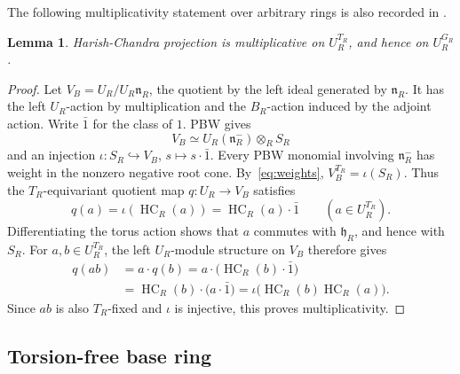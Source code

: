 \documentclass[twoside,a4paper,12pt,reqno]{amsart}
\newtheorem{lemma}[theorem]{Lemma}
\theoremstyle{remark}
\numberwithin{equation}{section}
\newcommand{\fh}{\mathfrak h}
\newcommand{\fn}{\mathfrak n}
\DeclareMathOperator{\HC}{HC}
\newcommand{\into}{\hookrightarrow}
\begin{document}
The following multiplicativity statement over arbitrary rings is also recorded in \cite[\S2.6.1]{PT}.

\begin{lemma}\label{lem:multiplicativity}
Harish-Chandra projection is multiplicative on \(U_R^{T_R}\), and hence on \(U_R^{G_R}\).
\end{lemma}
\begin{proof}
Let \(V_B=U_R/U_R\fn_R\), the quotient by the left ideal generated by \(\fn_R\). It has the left \(U_R\)-action by multiplication and the \(B_R\)-action induced by the adjoint action. Write \(\bar1\) for the class of \(1\). PBW gives
\[
V_B\simeq U_R(\fn_R^-)\otimes_R S_R
\]
and an injection \(\iota:S_R\into V_B\), \(s\mapsto s\cdot\bar1\). Every PBW monomial involving \(\fn_R^-\) has weight in the nonzero negative root cone. By~\eqref{eq:weights}, \(V_B^{T_R}=\iota(S_R)\). Thus the \(T_R\)-equivariant quotient map \(q:U_R\to V_B\) satisfies
\[
q(a)=\iota(\HC_R(a))=\HC_R(a)\cdot\bar1
\qquad(a\in U_R^{T_R}).
\]
Differentiating the torus action shows that \(a\) commutes with \(\fh_R\), and hence with \(S_R\). For \(a,b\in U_R^{T_R}\), the left \(U_R\)-module structure on \(V_B\) therefore gives
\[
\begin{aligned}
q(ab)&=a\cdot q(b)
=a\cdot\bigl(\HC_R(b)\cdot\bar1\bigr)\\
&=\HC_R(b)\cdot\bigl(a\cdot\bar1\bigr)
=\iota\bigl(\HC_R(b)\HC_R(a)\bigr).
\end{aligned}
\]
Since \(ab\) is also \(T_R\)-fixed and \(\iota\) is injective, this proves multiplicativity.
\end{proof}

\subsection{Torsion-free base ring}
\end{document}
